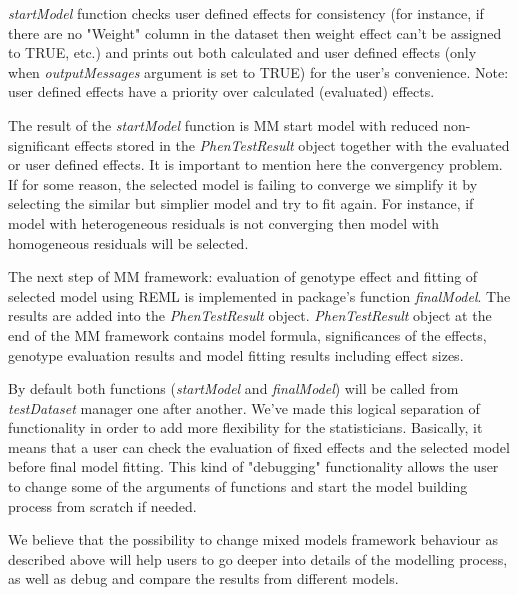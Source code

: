 \documentclass[12pt,a4paper]{article}
\begin{document}
\textit{startModel} function checks user defined effects for consistency (for instance, if there are no "Weight" column in the dataset then weight effect can't be assigned to TRUE, etc.)
and prints out both calculated and user defined effects (only when \textit{outputMessages} argument is set to TRUE) for the user's convenience. Note: user defined effects have a priority over calculated (evaluated) effects.

The result of the \textit{startModel} function is MM start model with reduced non-significant effects stored in the \textit{PhenTestResult} object together with the evaluated or user defined effects.
It is important to mention here the convergency problem. If for some reason, the selected model is failing to converge we simplify it by selecting the similar but simplier model and try to fit again. 
For instance, if model with heterogeneous residuals is not converging then model with homogeneous residuals will be selected.

The next step of MM framework: evaluation of genotype effect and fitting of selected model using REML is implemented in package's function \textit{finalModel}. 
The results are added into the \textit{PhenTestResult} object.  \textit{PhenTestResult} object at the end of the MM framework contains model formula, significances of the effects, genotype evaluation results and model fitting results including effect sizes.

By default both functions (\textit{startModel} and \textit{finalModel}) will be called from \textit{testDataset} manager one after another. 
We've made this logical separation of functionality in order to add more flexibility for the statisticians. 
Basically, it means that a user can check the evaluation of fixed effects and the selected model before final model fitting. 
This kind of "debugging" functionality allows the user to change some of the arguments of functions and start the model building process from scratch if needed.

We believe that the possibility to change mixed models framework behaviour as described above will help users to go deeper into details of the modelling process, 
as well as debug and compare the results from different models. 
\end{document}
